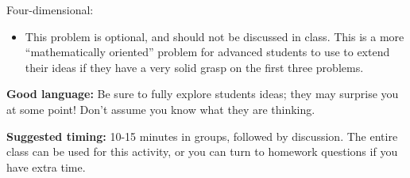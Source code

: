 \documentclass[nooutcomes,noauthor, handout]{ximera}
\begin{document}
\begin{instructorNotes}
Four-dimensional:  
    \begin{itemize}
        \item This problem is optional, and should not be discussed in class.  This is a more ``mathematically oriented'' problem for advanced students to use to extend their ideas if they have a very solid grasp on the first three problems.
    \end{itemize}
    

    
    
    {\bf Good language:} Be sure to fully explore students ideas; they may surprise you at some point! Don't assume you know what they are thinking.
    
{\bf Suggested timing:} 10-15 minutes in groups, followed by discussion. The entire class can be used for this activity, or you can turn to homework questions if you have extra time.


    \end{instructorNotes}   



    
\end{document}
